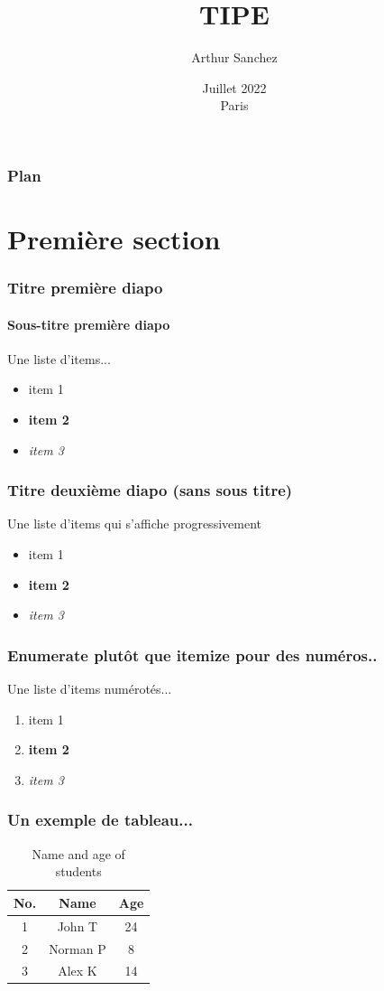 \documentclass{beamer}
\title[titre1]{TIPE}
\author[A. Sanchez]{Arthur Sanchez}
\date[]{Juillet 2022\\Paris}
\begin{document}
\begin{frame}[plain]
\titlepage
\end{frame}

\begin{frame}
\frametitle{Plan}
  \tableofcontents
\end{frame}

\section{Première section}

\begin{frame}
  \frametitle{Titre première diapo}
  \framesubtitle{Sous-titre première diapo}
  Une liste d'items...
  \begin{itemize}
  \item item 1
  \item \textbf{item 2} %
  \item \textit{item 3} %
  \end{itemize}
\end{frame}

\begin{frame}
  \frametitle{Titre deuxième diapo (sans sous titre)}
  Une liste d'items qui s'affiche progressivement
  \begin{itemize}
   \item item 1
  \item \textbf{item 2} %
  \item \textit{item 3} %
  \end{itemize}
\end{frame}

\begin{frame}
  \frametitle{Enumerate plutôt que itemize pour des numéros..}
  Une liste d'items numérotés...
  \begin{enumerate}
  \item item 1
  \item \textbf{item 2} %
  \item \textit{item 3} %
  \end{enumerate}
\end{frame}

\begin{frame}
  \frametitle{Un exemple de tableau...}
  \begin{table}
    \begin{tabular}{| c || c | c |}
      \hline
      No. & Name & Age \\
      \hline \hline
      1 & John T & 24 \\
      2 & Norman P & 8 \\
      3 & Alex K & 14 \\ 
      \hline
    \end{tabular}
    \caption{Name and age of students}
  \end{table}
\end{frame}
\end{document}
